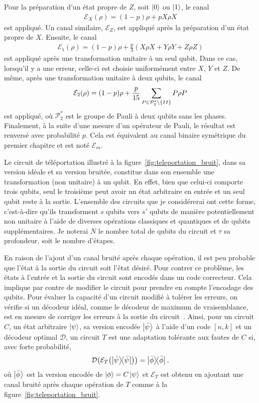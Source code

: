 Pour la préparation d'un état propre de $Z$, soit $\ket 0$ ou $\ket 1$,
le canal 
\begin{align}
\mathcal E_X(\rho) = (1 - p)\rho + pX\rho X
\end{align}
est appliqué.
Un canal similaire, $\mathcal E_Z$, est appliqué après la préparation
d'un état propre de $X$.
Ensuite,
le canal
\begin{align}
	\mathcal E_1(\rho) = (1 - p)\rho + \frac{p}{3}(X\rho X + Y\rho Y + Z\rho Z)
\end{align}
est appliqué après une transformation unitaire à un seul qubit.
Dans ce cas,
lorsqu'il y a une erreur,
celle-ci est choisie uniformément entre $X$, $Y$ et $Z$.
De même,
après une transformation unitaire à deux qubits,
le canal
\begin{align}
	\mathcal E_2(\rho)
	= (1 - p)\rho
	+ \frac{p}{15}\sum_{P \in \mathcal P_2^*\setminus \qty{II}} P\rho P
\end{align}
est appliqué,
où $\mathcal P_2^*$ est le groupe de Pauli à deux qubits sans les phases.
Finalement,
à la suite d'une mesure d'un opérateur de Pauli,
le résultat est renversé avec probabilité $p$.
Cela est équivalent au canal binaire symétrique du premier chapitre
et est noté $\mathcal E_m$.

Le circuit de téléportation illustré à la figure~\ref{fig:teleportation_bruit},
dans sa version idéale et sa version bruitée,
constitue dans son ensemble une transformation (non unitaire) à un qubit.
En effet,
bien que celui-ci comporte trois qubits,
seul le troisième peut avoir un état arbitraire en entrée et un seul qubit reste à la sortie.
L'ensemble des circuits que je considérerai ont cette forme,
c'est-à-dire qu'ils transforment $s$ qubits vers $s'$ qubits de manière 
potentiellement non unitaire à l'aide de diverses opérations classiques et quantiques
et de qubits supplémentaires.
Je noterai $N$ le nombre total de qubits du circuit et $\tau$
sa profondeur, soit le nombre d'étapes. 

En raison de l'ajout d'un canal bruité après chaque opération,
il est peu probable que l'état à la sortie du circuit soit l'état désiré.
Pour contrer ce problème,
les états à l'entrée et la sortie du circuit sont encodés dans un code correcteur.
Cela implique par contre de modifier le circuit pour prendre en compte l'encodage des qubits.
Pour évaluer la capacité d'un circuit modifié à tolérer les erreurs,
on vérifie si un décodeur idéal, comme le décodeur de maximum de vraisemblance, est en 
mesure de corriger les erreurs à la sortie du circuit~\cite{gottesman_introduction_2009}.
Ainsi,
pour un circuit $C$,
un état arbitraire $\ket{\psi}$,
sa version encodée $\ket{\bar{\psi}}$ à l'aide d'un code $[n, k]$
et un décodeur optimal $\mathcal D$,
un circuit $T$ est une adaptation tolérante aux fautes de $C$ si,
avec forte probabilité,
\begin{align}
	\mathcal D\qty(\mathcal E_T\qty(\op{\bar \psi}) )
	= \op{\bar \phi},
	\label{eq:tol_faute_condition}
\end{align}
où $\ket{\bar \phi}$ est la version encodée de $\ket{\phi} = C \ket\psi$
et $\mathcal E_T$ est obtenu en ajoutant une canal bruité après chaque opération
de $T$ comme à la figure~\ref{fig:teleportation_bruit}.

